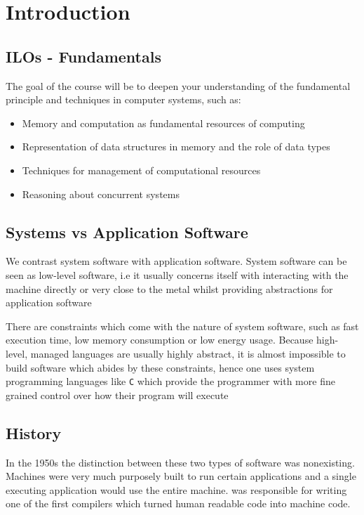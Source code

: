 \section{Introduction}

\subsection{ILOs - Fundamentals}

\par{The goal of the course will be to deepen your understanding of the fundamental
principle and techniques in computer systems, such as:}
\begin{itemize}
	\item Memory and computation as fundamental resources of computing
	\item Representation of data structures in memory and the role of data types
	\item Techniques for management of computational resources
	\item Reasoning about concurrent systems
\end{itemize}


\subsection{Systems vs Application Software}

\par{We contrast system software with application software. System software can be seen as
low-level software, i.e it usually concerns itself with interacting with the machine directly or
very close to the metal whilst providing abstractions for application software}
\par{There are constraints which come with the nature of system software, such as fast
execution time, low memory consumption or low energy usage. Because high-level, managed languages are usually
highly abstract, it is almost impossible to build software which abides by these constraints, hence
one uses system programming languages like \texttt{C} which provide the programmer with more fine
grained control over how their program will execute}


\subsection{History}

\par{In the 1950s the distinction between these two types of software was nonexisting.
Machines were very much purposely built to run certain applications and a single executing
application would use the entire machine.  was responsible for writing one of the
first compilers which turned human readable code into machine code.}


